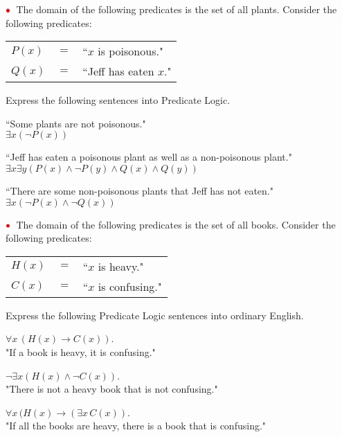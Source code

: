 \documentclass[12pt]{exam}
\newcommand{\red}[1]{{\color{red}#1}}
\newcommand{\redbullet}{\red{\bullet}}
\renewcommand{\And}{\mathbin{\wedge}}
\newcommand{\Implies}{\mathbin{\rightarrow}}
\newcommand{\Not}{\mathop{\neg}}
\newcommand{\<}{\langle}
\renewcommand{\>}{\rangle}
\theoremstyle{definition}   %
\begin{document}
\medskip
\begin{questions}
  \question $\redbullet$\ The domain of the following predicates is the set of all plants.
  Consider the following predicates:
  
  \begin{center}
  \begin{tabular}{lcl}
  $P(x)$ & $=$ & ``$x$ is poisonous." \\
  $Q(x)$ & $=$ & ``Jeff has eaten $x$." \\
  \end{tabular}
  \end{center}

Express the following sentences into Predicate Logic.
\begin{parts}
\item ``Some plants are not poisonous." \\
$\exists x (\neg P(x)) $
\item ``Jeff has eaten a poisonous plant as well as a non-poisonous plant." \\
$\exists x \exists y (P(x) \land \neg P(y) \land Q(x) \land Q(y)) $
\item ``There are some non-poisonous plants that Jeff has not eaten." \\
$\exists x (\neg P(x) \land \neg Q(x))$
\end{parts}


  \question $\redbullet$\ The domain of the following predicates is the set of all books.
  Consider the following predicates:
  
  \begin{center}
  \begin{tabular}{lcl}
  $H(x)$ & $=$ & ``$x$ is heavy." \\
  $C(x)$ & $=$ & ``$x$ is confusing." \\
  \end{tabular}
  \end{center}

Express the following Predicate Logic sentences into ordinary English.
\begin{parts}
\item $\forall x\, (H(x) \Implies C(x))$. \\
"If a book is heavy, it is confusing."
\item $\Not \exists x (H(x) \And \Not C(x))$. \\
"There is not a heavy book that is not confusing."
\item $\forall x\, (H(x) \Implies (\exists x\, C(x))$. \\
"If all the books are heavy, there is a book that is confusing."
\end{parts}


\end{questions}
\end{document}
